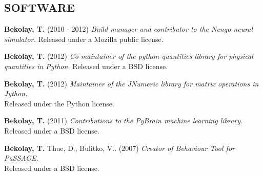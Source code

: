\documentclass[line,margin]{res}
\begin{document}
\begin{resume}
\section{SOFTWARE}
  \textbf{Bekolay, T.} (2010 - 2012)
    {\sl Build manager and contributor to the Nengo neural simulator.}
    Released under a Mozilla public license.

  \textbf{Bekolay, T.} (2012)
    {\sl Co-maintainer of the python-quantities library for physical quantities in Python.} Released under a BSD license.

  \textbf{Bekolay, T.} (2012)
    {\sl Maintainer of the JNumeric library for matrix operations in Jython.} \\
    Released under the Python license.

  \textbf{Bekolay, T.} (2011)
    {\sl Contributions to the PyBrain machine learning library.} \\
    Released under a BSD license.

  \textbf{Bekolay, T.} Thue, D., Bulitko, V.. (2007)
    {\sl Creator of Behaviour Tool for PaSSAGE.} \\
    Released under a BSD license.

\end{resume}
\end{document}
